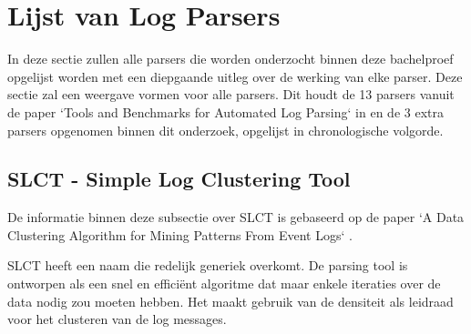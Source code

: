 \section{Lijst van Log Parsers}
In deze sectie zullen alle parsers die worden onderzocht binnen deze bachelproef opgelijst worden met een diepgaande uitleg over de werking van elke parser. Deze sectie zal een weergave vormen voor alle parsers. Dit houdt de 13 parsers vanuit de paper `Tools and Benchmarks for Automated Log Parsing` \autocite{TBA2019} in en de 3 extra parsers opgenomen binnen dit onderzoek, opgelijst in chronologische volgorde.

\subsection{SLCT - Simple Log Clustering Tool}
De informatie binnen deze subsectie over SLCT is gebaseerd op de paper `A Data Clustering Algorithm for Mining Patterns From Event Logs` \autocite{vaarandi2003data}. 

SLCT heeft een naam die redelijk generiek overkomt. De parsing tool is ontworpen als een snel en efficiënt algoritme dat maar enkele iteraties over de data nodig zou moeten hebben. Het maakt gebruik van de densiteit als leidraad voor het clusteren van de log messages. 

